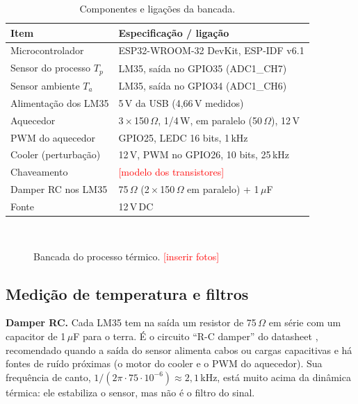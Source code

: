 \documentclass[a4paper]{ifacconf}
\newcommand{\pendente}[1]{\textcolor{red}{[#1]}}
\newcommand{\espacofoto}[2]{%
  \fbox{\parbox[c][#1][c]{0.92\columnwidth}{\centering\small\textcolor{red}{#2}}}}
\begin{document}
\begin{table}[hb]
\begin{center}
\caption{Componentes e ligações da bancada.}\label{tb:componentes}
\begin{tabular}{p{2.6cm}p{5.0cm}}\toprule
Item & Especificação / ligação \\ \midrule
Microcontrolador & ESP32-WROOM-32 DevKit, ESP-IDF v6.1 \\
Sensor do processo $T_p$ & LM35, saída no GPIO35 (ADC1\_CH7) \\
Sensor ambiente $T_a$ & LM35, saída no GPIO34 (ADC1\_CH6) \\
Alimentação dos LM35 & 5\,V da USB (4,66\,V medidos) \\
Aquecedor & 3\,$\times$\,150\,$\Omega$, 1/4\,W, em paralelo (50\,$\Omega$), 12\,V \\
PWM do aquecedor & GPIO25, LEDC 16 bits, 1\,kHz \\
Cooler (perturbação) & 12\,V, PWM no GPIO26, 10 bits, 25\,kHz \\
Chaveamento & \pendente{modelo dos transistores} \\
Damper RC nos LM35 & 75\,$\Omega$ (2\,$\times$\,150\,$\Omega$ em paralelo) + 1\,$\mu$F \\
Fonte & 12\,V\,DC \\ \bottomrule
\end{tabular}
\end{center}
\end{table}

\begin{figure}[hbt]
 \begin{center}
  \espacofoto{4.2cm}{Foto da bancada completa (ESP32, protoboard, fonte, cooler, sensores)}\\[1mm]
  \espacofoto{4.2cm}{Foto do detalhe: resistores encostados no LM35 do processo e posição do cooler}
 \caption{Bancada do processo térmico. \pendente{inserir fotos}}
 \label{fig:fotos}
 \end{center}
\end{figure}

\subsection{Medição de temperatura e filtros}

\textbf{Damper RC.} Cada LM35 tem na saída um resistor de 75\,$\Omega$ em série com um capacitor
de 1\,$\mu$F para o terra. É o circuito ``R-C damper'' do datasheet \citep{TI:LM35}, recomendado
quando a saída do sensor alimenta cabos ou cargas capacitivas e há fontes de ruído próximas
(o motor do cooler e o PWM do aquecedor). Sua frequência de canto,
$1/(2\pi\cdot 75\cdot 10^{-6})\approx 2{,}1$\,kHz, está muito acima da dinâmica térmica: ele
estabiliza o sensor, mas não é o filtro do sinal.
\end{document}
